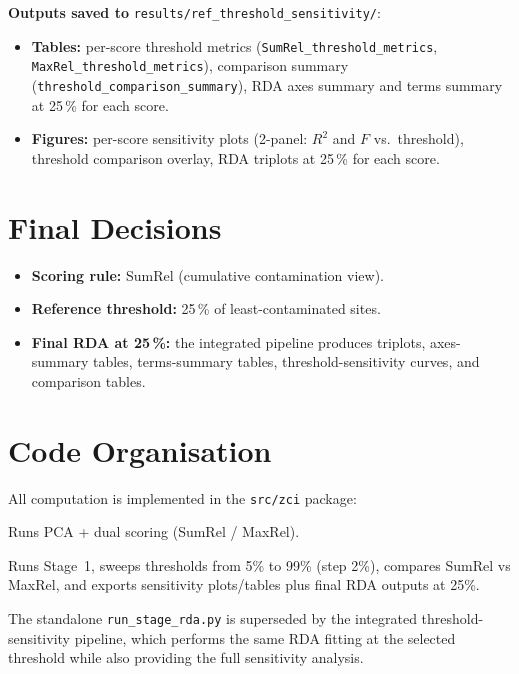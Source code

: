 \documentclass[11pt]{article}
\begin{document}
\noindent
\textbf{Outputs saved to} \texttt{results/ref\_threshold\_sensitivity/}:
\begin{itemize}[leftmargin=*]
  \item \textbf{Tables:}
    per-score threshold metrics
    (\texttt{SumRel\_threshold\_metrics},
     \texttt{MaxRel\_threshold\_metrics}),
    comparison summary
    (\texttt{threshold\_comparison\_summary}),
    RDA axes summary and terms summary at 25\,\% for each score.
  \item \textbf{Figures:}
    per-score sensitivity plots (2-panel: $R^2$ and $F$ vs.\
    threshold),
    threshold comparison overlay,
    RDA triplots at 25\,\% for each score.
\end{itemize}

\section{Final Decisions}

\begin{itemize}
  \item \textbf{Scoring rule:} SumRel (cumulative contamination view).
  \item \textbf{Reference threshold:} 25\,\% of least-contaminated
    sites.
  \item \textbf{Final RDA at 25\,\%:} the integrated pipeline produces
    triplots, axes-summary tables, terms-summary tables,
    threshold-sensitivity curves, and comparison tables.
\end{itemize}

\section{Code Organisation}

All computation is implemented in the \texttt{src/zci} package:

\begin{description}[style=nextline]
  \item[\texttt{run\_stage1.py}]
    Runs PCA + dual scoring (SumRel / MaxRel).
  \item[\texttt{run\_stage\_threshold.py}]
    Runs Stage~1, sweeps thresholds from 5\% to 99\% (step 2\%),
    compares SumRel vs MaxRel, and exports sensitivity plots/tables
    plus final RDA outputs at 25\%.
\end{description}

\noindent
The standalone \texttt{run\_stage\_rda.py} is superseded by the
integrated threshold-sensitivity pipeline, which performs the same
RDA fitting at the selected threshold while also providing the full
sensitivity analysis.
\end{document}
